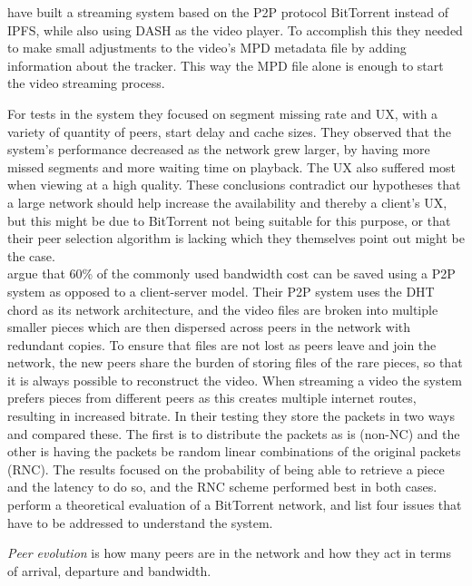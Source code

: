 \citet{gazdar2017toward} have built a streaming system based on the \ac{P2P} protocol BitTorrent instead of \ac{IPFS}, while also using \ac{DASH} as the video player. To accomplish this they needed to make small adjustments to the video's \ac{MPD} metadata file by adding information about the tracker. This way the \ac{MPD} file alone is enough to start the video streaming process.

For tests in the system they focused on segment missing rate and \ac{UX}, with a variety of quantity of peers, start delay and cache sizes. They observed that the system's performance decreased as the network grew larger, by having more missed segments and more waiting time on playback. The \ac{UX} also suffered most when viewing at a high quality. These conclusions contradict our hypotheses that a large network should help increase the availability and thereby a client's \ac{UX}, but this might be due to BitTorrent not being suitable for this purpose, or that their peer selection algorithm is lacking which they themselves point out might be the case.
\\


\citet{nguyen2009p2p} argue that 60\% of the commonly used bandwidth cost can be saved using a \ac{P2P} system as opposed to a client-server model. Their \ac{P2P} system uses the \ac{DHT} chord as its network architecture, and the video files are broken into multiple smaller pieces which are then dispersed across peers in the network with redundant copies. To ensure that files are not lost as peers leave and join the network, the new peers share the burden of storing files of the rare pieces, so that it is always possible to reconstruct the video. When streaming a video the system prefers pieces from different peers as this creates multiple internet routes, resulting in increased bitrate. In their testing they store the packets in two ways and compared these. The first is to distribute the packets as is (non-\ac{NC}) and the other is having the packets be random linear combinations of the original packets (\ac{RNC}). The results focused on the probability of being able to retrieve a piece and the latency to do so, and the \ac{RNC} scheme performed best in both cases.
\\


\citet{qiu2004modeling} perform a theoretical evaluation of a BitTorrent network, and list four issues that have to be addressed to understand the system.

\emph{Peer evolution} is how many peers are in the network and how they act in terms of arrival, departure and bandwidth.

